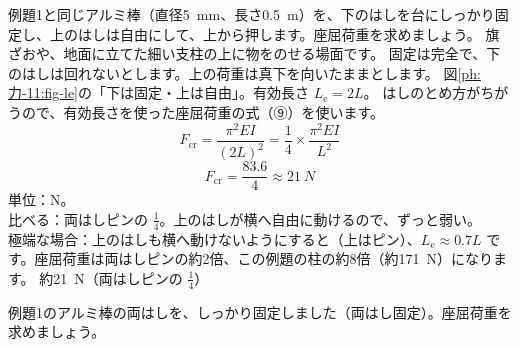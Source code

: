 \begin{phreidai}
\label{ph:力-11:ex3}例題1と同じアルミ棒（直径\qty{5}{mm}、長さ\qty{0.5}{m}）を、下のはしを台にしっかり固定し、上のはしは自由にして、上から押します。座屈荷重を求めましょう。
\phbamen
旗ざおや、地面に立てた細い支柱の上に物をのせる場面です。
\phmushi
固定は完全で、下のはしは回れないとします。上の荷重は真下を向いたままとします。
\phzu
図\ref{ph:力-11:fig-le}の「下は固定・上は自由」。有効長さ $L_{\mathrm e}=2L$。
\phriyu
はしのとめ方がちがうので、有効長さを使った座屈荷重の式（⑨）を使います。
\phtateru
\[ F_{\mathrm{cr}}=\frac{\pi^2EI}{(2L)^2}=\frac{1}{4}\times\frac{\pi^2EI}{L^2} \]
\phtoku
\[ F_{\mathrm{cr}}=\frac{83.6}{4}\approx\qty{21}{N} \]
\phtashikame
単位：N。\\
比べる：両はしピンの $\tfrac{1}{4}$。上のはしが横へ自由に動けるので、ずっと弱い。\\
極端な場合：上のはしも横へ動けないようにすると（上はピン）、$L_{\mathrm e}\approx0.7L$ です。座屈荷重は両はしピンの約2倍、この例題の柱の約8倍（約\qty{171}{N}）になります。
\kotae 約\qty{21}{N}（両はしピンの $\tfrac{1}{4}$）
\end{phreidai}
\begin{jibun}
例題1のアルミ棒の両はしを、しっかり固定しました（両はし固定）。座屈荷重を求めましょう。
\end{jibun}

